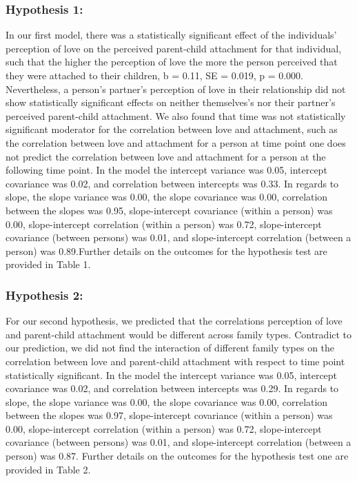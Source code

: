\documentclass[man]{apa6}
\begin{document}
\hypertarget{hypothesis-1}{%
\subsubsection{Hypothesis 1:}\label{hypothesis-1}}

In our first model, there was a statistically significant effect of the individuals' perception of love on the perceived parent-child attachment for that individual, such that the higher the perception of love the more the person perceived that they were attached to their children, b = 0.11, SE = 0.019, p = 0.000. Nevertheless, a person's partner's perception of love in their relationship did not show statistically significant effects on neither themselves's nor their partner's perceived parent-child attachment. We also found that time was not statistically significant moderator for the correlation between love and attachment, such as the correlation between love and attachment for a person at time point one does not predict the correlation between love and attachment for a person at the following time point. In the model the intercept variance was 0.05, intercept covariance was 0.02, and correlation between intercepts was 0.33. In regards to slope, the slope variance was 0.00, the slope covariance was 0.00, correlation between the slopes was 0.95, slope-intercept covariance (within a person) was 0.00, slope-intercept correlation (within a person) was 0.72, slope-intercept covariance (between persons) was 0.01, and slope-intercept correlation (between a person) was 0.89.Further details on the outcomes for the hypothesis test are provided in Table 1.

\hypertarget{hypothesis-2}{%
\subsubsection{Hypothesis 2:}\label{hypothesis-2}}

For our second hypothesis, we predicted that the correlations perception of love and parent-child attachment would be different across family types. Contradict to our prediction, we did not find the interaction of different family types on the correlation between love and parent-child attachment with respect to time point statistically significant. In the model the intercept variance was 0.05, intercept covariance was 0.02, and correlation between intercepts was 0.29. In regards to slope, the slope variance was 0.00, the slope covariance was 0.00, correlation between the slopes was 0.97, slope-intercept covariance (within a person) was 0.00, slope-intercept correlation (within a person) was 0.72, slope-intercept covariance (between persons) was 0.01, and slope-intercept correlation (between a person) was 0.87. Further details on the outcomes for the hypothesis test one are provided in Table 2.
\end{document}
